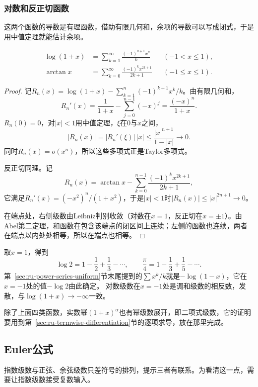 \subsubsection{对数和反正切函数}
\label{sec:ru-taylor-log-arctan}
这两个函数的导数是有理函数，借助有限几何和，余项的导数可以写成闭式，于是用中值定理就能估计余项。
\begin{theorem}[对数和反正切函数的展开]
\label{thm:ru-log-arctan-series}
\begin{equation}
 \begin{aligned}
 \log(1+x)&=\sum_{k=1}^\infty\frac{(-1)^{k+1}x^k}{k}&&(-1<x\leq1),\\
 \arctan x&=\sum_{k=0}^\infty\frac{(-1)^kx^{2k+1}}{2k+1}&&(-1\leq x\leq1).
 \end{aligned}
 \label{eq:ru-log-arctan-series}
\end{equation}
\end{theorem}
\begin{proof}
记$R_n(x)=\log(1+x)-\sum_{k=1}^n(-1)^{k+1}x^k/k$。由有限几何和，
\[
 R_n'(x)=\frac1{1+x}-\sum_{j=0}^{n-1}(-x)^j=\frac{(-x)^n}{1+x}.
\]
$R_n(0)=0$，对$|x|<1$用中值定理，$\xi$在$0$与$x$之间，
\[
 |R_n(x)|=|R_n'(\xi)|\,|x|\leq\frac{|x|^{n+1}}{1-|x|}\to0.
\]
同时$R_n(x)=o(x^n)$，所以这些多项式正是Taylor多项式。

反正切同理。记
\[
 R_n(x)=\arctan x-\sum_{k=0}^{n-1}\frac{(-1)^kx^{2k+1}}{2k+1},
\]
它满足$R_n'(x)=(-x^2)^n/(1+x^2)$，于是$|x|<1$时$|R_n(x)|\leq|x|^{2n+1}\to0$。

在端点处，右侧级数由Leibniz判别收敛（对数在$x=1$，反正切在$x=\pm1$）。由Abel第二定理，和函数在包含该端点的闭区间上连续；左侧的函数也连续，两者在端点以内处处相等，所以在端点也相等。
\end{proof}
取$x=1$，得到
\[
 \log2=1-\frac12+\frac13-\cdots,\qquad\frac\pi4=1-\frac13+\frac15-\cdots.
\]
第~\ref{sec:ru-power-series-uniform}节末尾提到的$\sum x^k/k$就是$-\log(1-x)$，它在$x=-1$处的值$-\log2$由此确定。
对数级数在$x=-1$处是调和级数的相反数，发散，与$\log(1+x)\to-\infty$一致。

除了上面四类函数，实数幂$(1+x)^\alpha$也有幂级数展开，即二项式级数，它的证明要用到第~\ref{sec:ru-termwise-differentiation}节的逐项求导，放在那里完成。

\subsection{Euler公式}
\label{sec:ru-euler-formula}
\label{sec:ru-trig-expansion-complex-exponential}

指数级数与正弦、余弦级数只差符号的排列，提示三者有联系。为看清这一点，需要让指数级数接受复数输入。

